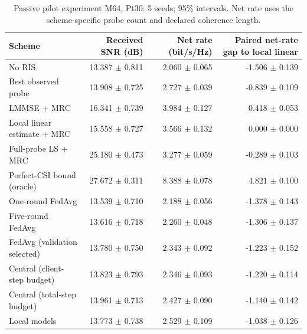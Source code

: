 \begin{table}[t]\centering\small
\caption{Passive pilot experiment M64, Pt30: 5 seeds; 95\% intervals. Net rate uses the scheme-specific probe count and declared coherence length.}
\begin{tabular}{lrrr}\toprule Scheme & Received SNR (dB) & Net rate (bit/s/Hz) & Paired net-rate gap to local linear\\\midrule
No RIS & 13.387 $\pm$ 0.811 & 2.060 $\pm$ 0.065 & -1.506 $\pm$ 0.139\\
Best observed probe & 13.908 $\pm$ 0.725 & 2.727 $\pm$ 0.039 & -0.839 $\pm$ 0.109\\
LMMSE + MRC & 16.341 $\pm$ 0.739 & 3.984 $\pm$ 0.127 & 0.418 $\pm$ 0.053\\
Local linear estimate + MRC & 15.558 $\pm$ 0.727 & 3.566 $\pm$ 0.132 & 0.000 $\pm$ 0.000\\
Full-probe LS + MRC & 25.180 $\pm$ 0.473 & 3.277 $\pm$ 0.059 & -0.289 $\pm$ 0.103\\
Perfect-CSI bound (oracle) & 27.672 $\pm$ 0.311 & 8.388 $\pm$ 0.078 & 4.821 $\pm$ 0.100\\
One-round FedAvg & 13.539 $\pm$ 0.710 & 2.188 $\pm$ 0.056 & -1.378 $\pm$ 0.143\\
Five-round FedAvg & 13.616 $\pm$ 0.718 & 2.260 $\pm$ 0.048 & -1.306 $\pm$ 0.137\\
FedAvg (validation selected) & 13.780 $\pm$ 0.750 & 2.343 $\pm$ 0.092 & -1.223 $\pm$ 0.152\\
Central (client-step budget) & 13.823 $\pm$ 0.793 & 2.346 $\pm$ 0.093 & -1.220 $\pm$ 0.114\\
Central (total-step budget) & 13.961 $\pm$ 0.713 & 2.427 $\pm$ 0.090 & -1.140 $\pm$ 0.142\\
Local models & 13.773 $\pm$ 0.738 & 2.529 $\pm$ 0.109 & -1.038 $\pm$ 0.126\\
\bottomrule\end{tabular}\end{table}
